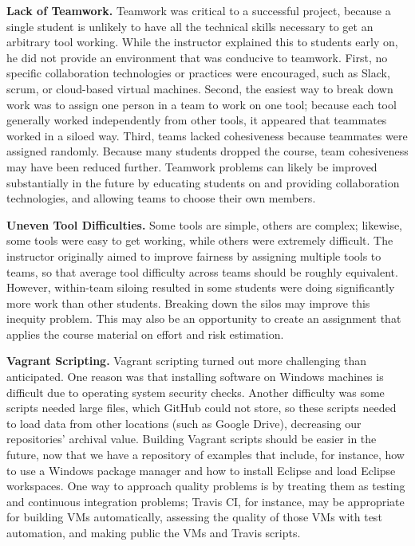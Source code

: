 \documentclass[10pt,conference]{IEEEtran}
\begin{document}
\textbf{Lack of Teamwork.}
  	Teamwork was critical to a successful project, because a single student
  	is unlikely to have all the technical skills necessary to get an
  	arbitrary tool working.
  	While the instructor explained this to students early on, 
  	he did not provide an environment that was conducive to teamwork.
  	First, no specific collaboration technologies or practices were encouraged,
  	such as Slack, scrum, or cloud-based virtual machines.
  	Second, the easiest way to break down work was to assign one person in a team
  	to work on one tool; because each tool generally worked independently
  	from other tools, it appeared that teammates worked in a siloed way.  	
  	Third, teams lacked cohesiveness because teammates were assigned randomly.
  	Because many students dropped the course, team cohesiveness may have 
	been reduced further.
	Teamwork problems can likely be improved substantially in the future by 
	educating students on and providing collaboration technologies, and allowing
	teams to choose their own members. 

\textbf{Uneven Tool Difficulties.}
  	Some tools are simple, others are complex; likewise,
  	some tools were easy to get working, while others were extremely difficult.
  	The instructor originally aimed to improve fairness by assigning multiple tools
  	to teams, so that average tool difficulty across teams should be roughly equivalent.
  	However, within-team siloing resulted in some students were doing
  	significantly more work than other students.  
  	Breaking down the silos may improve this inequity problem.
  	This may also be an opportunity to create an assignment that applies the course
  	material on effort and risk estimation.   	

\textbf{Vagrant Scripting.}
  	Vagrant scripting turned out more challenging than anticipated.
  	One reason was that installing software on Windows machines is difficult
  	due to operating system security checks.
  	Another difficulty was some scripts needed large files, which GitHub could not
  	store, so these scripts needed to load data from other locations 
  	(such as Google Drive), decreasing our repositories' archival value. 
  	Building Vagrant scripts should be easier in the future, now that
  	we have a repository of examples that include, for instance, how to
  	use a Windows package manager and how to 
  	install Eclipse and load Eclipse workspaces. 
  	One way to approach quality problems is by treating them as testing and 
  	continuous integration problems; Travis CI,
  	for instance, may be appropriate for building VMs automatically,
  	assessing the quality of those VMs with test automation,
  	and making public the VMs and Travis scripts.
\end{document}
